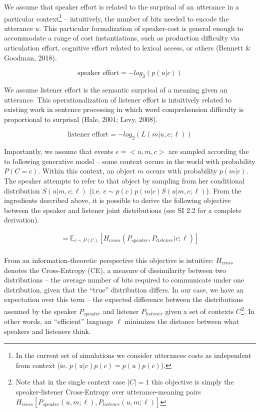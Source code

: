 \documentclass[10pt, letterpaper]{article}
\begin{document}
We assume that speaker effort is related to the surprisal of an
utterance in a particular
context\footnote{In the current set of simulations we consider utterances costs as independent from context (ie. $p(u|c)p(c)=p(u)p(c)$).}
-- intuitively, the number of bits needed to encode the utterance \(u\).
This particular formalization of speaker-cost is general enough to
accommodate a range of cost instantiations, such as production
difficulty via articulation effort, cognitive effort related to lexical
access, or others (Bennett \& Goodman, 2018).\par

\[\text{speaker effort} = -log_2(p(u|c))\]

We assume listener effort is the semantic surprisal of a meaning given
an utterance. This operationalization of listener effort is intuitively
related to existing work in sentence processing in which word
comprehension difficulty is proportional to surprisal (Hale, 2001; Levy,
2008).

\[\text{listener effort} = -log_2(L(m|u, c; \ell))\]

Importantly, we assume that events \(e = <u, m, c>\) are sampled
according the to following generative model -- some context occurs in
the world with probability \(P(C=c)\). Within this context, an object
\(m\) occurs with probability \(p(m|c)\). The speaker attempts to refer
to that object by sampling from her conditional distribution
\(S(u|m, c; \ell)\) (i.e. \(e \sim p(c)p(m|c)S(u|m, c; \ell)\)). From
the ingredients described above, it is possible to derive the following
objective between the speaker and listener joint distributions (see SI
2.2 for a complete derivation).

\begin{equation}
\begin{split}
  = \mathbb{E}_{c \sim P(C)}[H_{cross}(P_{speaker}, P_{listener} | c; \ell)]\\
\end{split}
\end{equation}

From an information-theoretic perspective this objective is intuitive:
\(H_{cross}\) denotes the Cross-Entropy (CE), a measure of dissimilarity
between two distributions -- the average number of bits required to
communicate under one distribution, given that the ``true'' distribution
differs. In our case, we have an expectation over this term -- the
expected difference between the distributions assumed by the speaker
\(P_{speaker}\) and listener \(P_{listener}\) given a set of contexts
\(C\)\footnote{Note that in the single context case $|C|=1$ this objective is simply the speaker-listener Cross-Entropy over utterance-meaning pairs $H_{cross}[P_{speaker}(u, m; \ell), P_{listener}(u, m; \ell)]$}.
In other words, an ``efficient'' language \(\ell\) minimizes the
distance between what speakers and listeners think.
\end{document}
